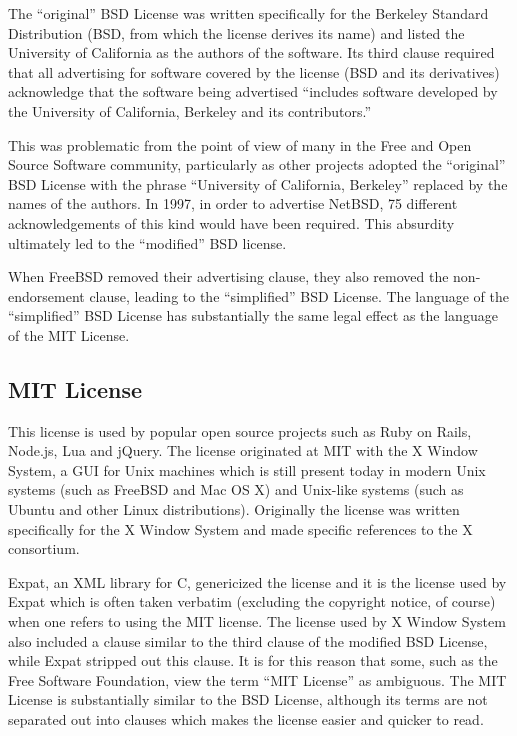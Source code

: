 \documentclass[12pt,letterpaper]{article}
\begin{document}
The ``original'' BSD License was written specifically for the Berkeley Standard Distribution (BSD, from which the license derives its name) and listed the University of California as the authors of the software. Its third clause required that all advertising for software covered by the license (BSD and its derivatives) acknowledge that the software being advertised ``includes software developed by the University of California, Berkeley and its contributors.''\cite{originalbsd}

This was problematic from the point of view of many in the Free and Open Source Software community, particularly as other projects adopted the ``original'' BSD License with the phrase ``University of California, Berkeley'' replaced by the names of the authors. In 1997, in order to advertise NetBSD, 75 different acknowledgements of this kind would have been required. This absurdity ultimately led to the ``modified'' BSD license.\cite{netbsd}

When FreeBSD removed their advertising clause, they also removed the non-endorsement clause, leading to the ``simplified'' BSD License. The language of the ``simplified'' BSD License has substantially the same legal effect as the language of the MIT License.\cite{simplifiedbsd}

\subsection{MIT License}

This license is used by popular open source projects such as Ruby on Rails, Node.js, Lua and jQuery. The license originated at MIT with the X Window System, a GUI for Unix machines which is still present today in modern Unix systems (such as FreeBSD and Mac OS X) and Unix-like systems (such as Ubuntu and other Linux distributions). Originally the license was written specifically for the X Window System and made specific references to the X consortium. \cite{x11}

Expat, an XML library for C, genericized the license and it is the license used by Expat which is often taken verbatim (excluding the copyright notice, of course) when one refers to using the MIT license. \cite{mit} The license used by X Window System also included a clause similar to the third clause of the modified BSD License, while Expat stripped out this clause. It is for this reason that some, such as the Free Software Foundation, view the term ``MIT License'' as ambiguous. \cite{licenselist} The MIT License is substantially similar to the BSD License, although its terms are not separated out into clauses which makes the license easier and quicker to read.
\end{document}
